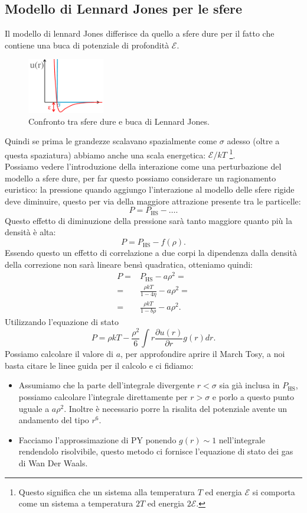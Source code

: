 \subsection{Modello di Lennard Jones per le sfere}
\label{subsec:Modello di Lennard Jones per le sfere}
Il modello di lennard Jones differisce da quello a sfere dure per il fatto che contiene una buca di potenziale di profondità $\mathcal{E}$.
\begin{figure}[ht]
	\centering
	\includegraphics[width=0.3\textwidth]{figures/buca-Lennard-Jones.png}
	\caption{Confronto tra sfere dure e buca di Lennard Jones.}
	\label{fig:figures-buca-Lennard-Jones-png}
\end{figure}
Quindi se prima le grandezze scalavano spazialmente come $\sigma$ adesso (oltre a questa spaziatura) abbiamo anche una scala energetica: $\mathcal{E}/kT$ \footnote{Questo significa che un sistema alla temperatura $T$ ed energia $\mathcal{E}$ si comporta come un sistema a temperatura $2T$ ed energia $2\mathcal{E}$.}.\\
Possiamo vedere l'introduzione della interazione come una perturbazione del modello a sfere dure, per far questo possiamo considerare un ragionamento euristico: 
la pressione quando aggiungo l'interazione al modello delle sfere rigide deve diminuire, questo per via della maggiore attrazione presente tra le particelle:
\[
	P = P_\text{HS} - \ldots
.\] 
Questo effetto di diminuzione della pressione sarà tanto maggiore quanto più la densità è alta: 
\[
	P=P_\text{HS} - f(\rho )
.\] 
Essendo questo un effetto di correlazione a due corpi la dipendenza dalla densità della correzione non sarà lineare bensì quadratica, otteniamo quindi:
\[\begin{aligned}
	P
	=&
	P_\text{HS} - a \rho ^2 =\\
	=&
	\frac{\rho kT}{1-4\eta}-a\rho ^2=\\
	=&\frac{\rho kT}{1-b\rho }-a\rho ^2
.\end{aligned}\]
Utilizzando l'equazione di stato 
\[
	P 
	=
	\rho kT - \frac{\rho ^2}{6}\int r \frac{\partial u(r)}{\partial r} g(r) dr
.\]
Possiamo calcolare il valore di $a$, per approfondire aprire il March Tosy, a noi basta citare le linee guida per il calcolo e ci fidiamo:
\begin{itemize}
	\item Assumiamo che la parte dell'integrale divergente $r<\sigma$ sia già inclusa
		in $P_\text{HS}$, possiamo calcolare l'integrale direttamente per 
		$r>\sigma$ e porlo a questo punto uguale a $a\rho ^2$. Inoltre è
		necessario porre la risalita del potenziale avente un andamento del tipo
		$r^6$.
	\item Facciamo l'approssimazione di PY ponendo $g(r)\sim 1$ nell'integrale 
		rendendolo risolvibile, questo metodo ci fornisce l'equazione di stato 
		dei gas di Wan Der Waals.
\end{itemize}
